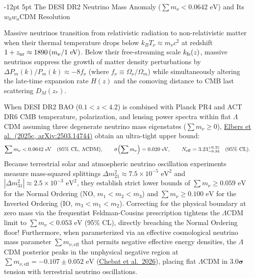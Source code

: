 \documentclass[11pt,letterpaper]{article}
\makeatletter
\renewcommand{\subsection}{\@startsection{subsection}{2}{\z@}%
  {-12pt \@plus -3pt \@minus -1pt}%
  {5pt \@plus 1pt}%
  {\normalfont\large\bfseries\color{tealaccent}}}
\makeatother
\begin{document}
\subsection{The DESI DR2 Neutrino Mass Anomaly ($\sum m_\nu < 0.0642\text{ eV}$) and Its $w_0 w_a$CDM Resolution}

Massive neutrinos transition from relativistic radiation to non-relativistic matter when their thermal temperature drops below $k_B T_\nu \approx m_\nu c^2$ at redshift $1 + z_{\rm nr} \approx 1890\, (m_\nu / 1\text{ eV})$. Below their free-streaming scale $k_{\rm fs}(z)$, massive neutrinos suppress the growth of matter density perturbations by $\Delta P_m(k)/P_m(k) \approx -8 f_\nu$ (where $f_\nu \equiv \Omega_\nu / \Omega_m$) while simultaneously altering the late-time expansion rate $H(z)$ and the comoving distance to CMB last scattering $D_M(z_*)$.

When DESI DR2 BAO ($0.1 < z < 4.2$) is combined with Planck PR4 and ACT DR6 CMB temperature, polarization, and lensing power spectra within flat $\Lambda$CDM assuming three degenerate neutrino mass eigenstates ($\sum m_\nu \ge 0$), \href{https://arxiv.org/abs/2503.14744}{Elbers et al.\ (2025c, arXiv:2503.14744)} obtain an ultra-tight upper bound:
\begin{equation}
    \sum m_\nu < 0.0642\text{ eV}\quad (95\%\text{ CL, }\Lambda\text{CDM}), \qquad \sigma\!\left(\sum m_\nu\right) = 0.020\text{ eV}, \qquad N_{\rm eff} = 3.23^{+0.35}_{-0.34}\quad (95\%\text{ CL}).
    \label{eq:desi_dr2_mnu_lcdm}
\end{equation}
Because terrestrial solar and atmospheric neutrino oscillation experiments measure mass-squared splittings $\Delta m_{21}^2 \approx 7.5 \times 10^{-5}\text{ eV}^2$ and $|\Delta m_{31}^2| \approx 2.5 \times 10^{-3}\text{ eV}^2$, they establish strict lower bounds of $\sum m_\nu \ge 0.059\text{ eV}$ for the Normal Ordering (NO, $m_1 < m_2 < m_3$) and $\sum m_\nu \ge 0.100\text{ eV}$ for the Inverted Ordering (IO, $m_3 < m_1 < m_2$). Correcting for the physical boundary at zero mass via the frequentist Feldman-Cousins prescription tightens the $\Lambda$CDM limit to $\sum m_\nu < 0.053\text{ eV}$ (95\% CL), directly breaching the Normal Ordering floor! Furthermore, when parameterized via an effective cosmological neutrino mass parameter $\sum m_{\nu,\text{eff}}$ that permits negative effective energy densities, the $\Lambda$CDM posterior peaks in the unphysical negative region at $\sum m_{\nu,\text{eff}} = -0.107 \pm 0.052\text{ eV}$ (\href{https://public.websites.umich.edu/~huterer/Papers/DESI-DR2/Chebat_DESI_freq_mnu.pdf}{Chebat et al.\ 2026}), placing flat $\Lambda$CDM in $\mathbf{3.0}\boldsymbol{\sigma}$ tension with terrestrial neutrino oscillations.
\end{document}
